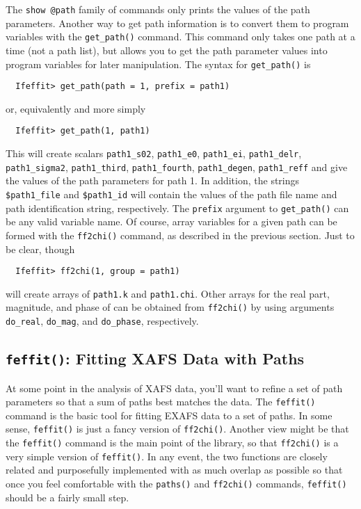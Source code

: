 \documentclass[11pt]{article}
\begin{document}
The {\tt{show @path}} family of commands only prints the values of the path
parameters.  Another way to get path information is to convert them to
program variables with the {\tt{get\_path()}} command.  This command only
takes one path at a time (not a path list), but allows you to get the path
parameter values into program variables for later manipulation.  The syntax
for {\tt{get\_path()}} is
{\small\begin{verbatim}
  Ifeffit> get_path(path = 1, prefix = path1)
\end{verbatim}
}\noindent
or, equivalently and more simply
{\small\begin{verbatim}
  Ifeffit> get_path(1, path1)
\end{verbatim}
}\noindent
This will create scalars {\tt{path1\_s02}}, {\tt{path1\_e0}},
{\tt{path1\_ei}}, {\tt{path1\_delr}}, {\tt{path1\_sigma2}},
{\tt{path1\_third}}, {\tt{path1\_fourth}}, {\tt{path1\_degen}},
{\tt{path1\_reff}} and give the values of the path parameters for path 1.
In addition, the strings {\tt{\$path1\_file}} and {\tt{\$path1\_id}} will
contain the values of the path {\feff} file name and path identification
string, respectively.  The {\tt{prefix}} argument to
{\tt{get\_path()}} can be any valid variable name.
Of course, array variables for a given path can be formed with the
{\tt{ff2chi()}} command, as described in the previous section.  Just to be
clear, though
{\small\begin{verbatim}
  Ifeffit> ff2chi(1, group = path1)
\end{verbatim}}\noindent
\noindent
will create arrays of {\tt{path1.k}} and {\tt{path1.chi}}.  Other arrays
for the real part, magnitude, and phase of {\chik} can be obtained from
{\tt{ff2chi()}} by using arguments {\tt{do\_real}}, {\tt{do\_mag}}, and
{\tt{do\_phase}}, respectively.


\subsection{{\tt{feffit()}}: Fitting XAFS Data with
  Paths}\label{s:xafs-process:feffit}

At some point in the analysis of XAFS data, you'll want to refine a set of
path parameters so that a sum of paths best matches the data.  The
{\tt{feffit()}} command is the basic tool for fitting EXAFS data to a set
of paths.  In some sense, {\tt{feffit()}} is just a fancy version of
{\tt{ff2chi()}}.  Another view might be that the {\tt{feffit()}} command is
the main point of the {\ifeffit} library, so that {\tt{ff2chi()}} is a very
simple version of {\tt{feffit()}}.  In any event, the two functions are
closely related and purposefully implemented with as much overlap as
possible so that once you feel comfortable with the {\tt{paths()}} and
{\tt{ff2chi()}} commands, {\tt{feffit()}} should be a fairly small step.
\end{document}
